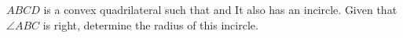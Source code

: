 $ABCD$ is a convex quadrilateral such that    and   It also has an incircle.  Given that $\angle ABC$ is right, determine the radius of this incircle.